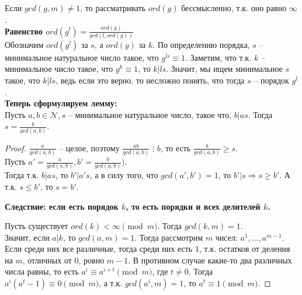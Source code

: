 Если $gcd(g, m) \neq 1$, то рассматривать $ord(g)$ бессмысленно, т.к. оно равно $\infty$.\\

\textbf{Равенство $ord(g^l) = \frac{ord(g)}{gcd(l, ord(g))}$}\\

Обозначим $ord(g^l)$ за $s$, а $ord(g)$ за $k$. По определению порядка, $s$ -- минимальное натуральное число такое, что $g^{ls} \equiv 1$. Заметим, что т.к. $k$ -- минимальное число такое, что $g^k \equiv 1$, то $k|ls$. Значит, мы ищем минимальное $s$ такое, что $k|ls$, ведь если это верно, то несложно понять, что тогда $s$ -- порядок $g^l$.\\


\textbf{Теперь сформулируем лемму:}\\

Пусть $a, b \in \mathcal{N}, s$ -- минимальное натуральное число, такое что, $b|as$. Тогда $s = \frac{b}{gcd(a, b)}$.

\begin{proof}
$\frac{a}{gcd(a,b)}$ -- целое, поэтому $\frac{ab}{gcd(a,b)}$ $\vdots$ $b$, то есть $\frac{b}{gcd(a, b)} \geq s$.\\

Пусть $a'= \frac{a}{gcd(a, b)}, b' = \frac{b}{gcd(a,b)})$. \\
Тогда т.к. $b|as$, то $b'|a's$, а в силу того, что $gcd(a', b') = 1$, то $b'|s \Rightarrow s \geq b'$. А т.к. $s \leq b'$, то $s = b'$.

\textbf{Следствие: если есть порядок $k$, то есть порядки и всех делителей $k$.}

Пусть существует $ord(k) < \infty \pmod{m}$. Тогда $gcd(k, m) = 1$.\\

Значит, если $a|k$, то $gcd(a, m) = 1$. Тогда рассмотрим $m$ чисел: $a^1, \dotsc, a^{m-1}$. Если среди них все различные, тогда среди них есть $1$, т.к. остатков от деления на $m$, отличных от $0$, ровно $m-1$. В противном случае какие-то два различных числа равны, то есть $a^i \equiv a^{i+t} \pmod{m}$, где $t \neq 0$. Тогда $a^i(a^t - 1) \equiv 0 \pmod{m}$, а т.к. $gcd(a^i, m) = 1$, то $a^t \equiv 1 \pmod{m}$. 
\end{proof}